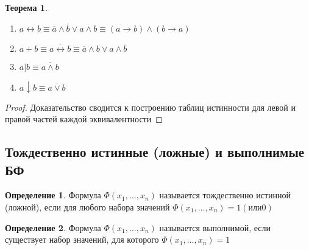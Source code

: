 \documentclass[a4paper]{article}
\newtheorem{theorem}{Теорема}[section]
\theoremstyle{definition}
\newtheorem*{definition}{Определение}
\theoremstyle{remark}
\begin{document}
\begin{theorem}
\begin{multicols*}{2}
\begin{enumerate}
                \item $a \leftrightarrow b \equiv \overline{a} \wedge \overline{b} \vee a \wedge b \equiv (a \rightarrow b) \wedge (b \rightarrow a)$
                \item $a + b \equiv \overline{a \leftrightarrow b} \equiv \overline{a} \wedge b \vee a \wedge \overline{b}$
                \item $a | b \equiv \overline{a \wedge b}$
                \item $a \downarrow b \equiv \overline{a \vee b}$
            \end{enumerate}
        \end{multicols*}
	\end{theorem}
    \begin{proof}
        Доказательство сводится к построению таблиц истинности для левой и правой частей каждой эквивалентности
    \end{proof}
    \subsection{Тождественно истинные (ложные) и выполнимые БФ}
    \begin{definition}
        Формула $\Phi(x_1, \dots, x_n)$ называется тождественно истинной
        (ложной), если для любого набора значений $\Phi(x_1, \dots, x_n) = 1 (или 0)$
    \end{definition}
    \begin{definition}
        Формула $\Phi(x_1, \dots, x_n)$ называется выполнимой, если
        существует набор значений, для которого $\Phi(x_1, \dots, x_n) = 1$
    \end{definition}
\end{document}

